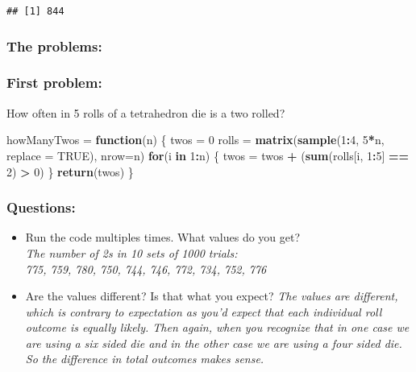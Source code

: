 \documentclass[
]{article}
\newenvironment{Shaded}{\begin{snugshade}}{\end{snugshade}}
\newcommand{\ControlFlowTok}[1]{\textcolor[rgb]{0.13,0.29,0.53}{\textbf{#1}}}
\newcommand{\DataTypeTok}[1]{\textcolor[rgb]{0.13,0.29,0.53}{#1}}
\newcommand{\DecValTok}[1]{\textcolor[rgb]{0.00,0.00,0.81}{#1}}
\newcommand{\KeywordTok}[1]{\textcolor[rgb]{0.13,0.29,0.53}{\textbf{#1}}}
\newcommand{\NormalTok}[1]{#1}
\newcommand{\OperatorTok}[1]{\textcolor[rgb]{0.81,0.36,0.00}{\textbf{#1}}}
\newcommand{\OtherTok}[1]{\textcolor[rgb]{0.56,0.35,0.01}{#1}}
\newcommand{\StringTok}[1]{\textcolor[rgb]{0.31,0.60,0.02}{#1}}
\begin{document}
\begin{verbatim}
## [1] 844
\end{verbatim}

\hypertarget{the-problems}{%
\subsubsection{The problems:}\label{the-problems}}

\hypertarget{first-problem}{%
\subsubsection{First problem:}\label{first-problem}}

How often in 5 rolls of a tetrahedron die is a two rolled?

\begin{Shaded}
\begin{Highlighting}[]
\NormalTok{howManyTwos =}\StringTok{ }\ControlFlowTok{function}\NormalTok{(n)}
\NormalTok{\{}
\NormalTok{  twos =}\StringTok{ }\DecValTok{0}
\NormalTok{  rolls =}\StringTok{ }\KeywordTok{matrix}\NormalTok{(}\KeywordTok{sample}\NormalTok{(}\DecValTok{1}\OperatorTok{:}\DecValTok{4}\NormalTok{, }\DecValTok{5}\OperatorTok{*}\NormalTok{n, }\DataTypeTok{replace =} \OtherTok{TRUE}\NormalTok{), }\DataTypeTok{nrow=}\NormalTok{n)}
  \ControlFlowTok{for}\NormalTok{(i }\ControlFlowTok{in} \DecValTok{1}\OperatorTok{:}\NormalTok{n)}
\NormalTok{  \{}
\NormalTok{    twos =}\StringTok{ }\NormalTok{twos }\OperatorTok{+}\StringTok{ }\NormalTok{(}\KeywordTok{sum}\NormalTok{(rolls[i, }\DecValTok{1}\OperatorTok{:}\DecValTok{5}\NormalTok{] }\OperatorTok{==}\StringTok{ }\DecValTok{2}\NormalTok{) }\OperatorTok{>}\StringTok{ }\DecValTok{0}\NormalTok{)}
\NormalTok{  \}  }
  \KeywordTok{return}\NormalTok{(twos)}
\NormalTok{\}}
\end{Highlighting}
\end{Shaded}

\hypertarget{questions-1}{%
\subsubsection{Questions:}\label{questions-1}}

\begin{itemize}
\item
  Run the code multiples times. What values do you get?\\
  \emph{The number of 2s in 10 sets of 1000 trials:}\\
  \emph{775, 759, 780, 750, 744, 746, 772, 734, 752, 776}
\item
  Are the values different? Is that what you expect? \emph{The values
  are different, which is contrary to expectation as you'd expect that
  each individual roll outcome is equally likely. Then again, when you
  recognize that in one case we are using a six sided die and in the
  other case we are using a four sided die. So the difference in total
  outcomes makes sense.}
\end{itemize}
\end{document}
